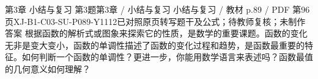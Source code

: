 \par\noindent\begin{minipage}{\linewidth}
\begin{bankitem}{第3章 小结与复习 第3题}{第3章 / 小结与复习 小结与复习 / 教材 p.89 / PDF 第96页}{XJ-B1-C03-SU-P089-Y1112}{已对照原页转写题干及公式；待教师复核；未制作答案}
根据函数的解析式或图象来探索它的性质，是数学的重要课题。函数的变化无非是变大变小，函数的单调性描述了函数的变化过程和趋势，是函数最重要的特征。如何判断一个函数的单调性？更进一步，你能用数学语言来表述吗？函数最值的几何意义如何理解？
\end{bankitem}
\end{minipage}\par\medskip
